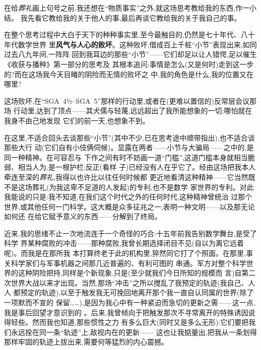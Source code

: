 在给\emph{葬礼}画上句号之前,我还想在“物质事实”之外,就这场思考教给我的东西,作一小结。
我先看它教给我的关于他人的事,最后再谈它教给我的关于我自己的事。

在整个思考过程中大白于天下的种种事实里,至今最触目的,仍然是七十年代、八十年代数学世界
里\textbf{风气与人心的败坏}。这种败坏,借成百上千桩“小节”表现出来,如同过去八九年间,一阵阵
回到我耳边的那些“小节”——它们却足以让人错愕,足以催生《收获与播种》第一部分的思考及
其根本追问:事情是怎么(又是何时)走到这一步的?而在这场我今天目睹的阴险而无情的败坏之
中,我的角色是什么,我的位置又在哪里?

\pmark{}这场败坏,在“SGA~4½--SGA~5”那样的行动里,或者在(更难以置信的)反常层会议那场
行动里,达到了顶点——其犬儒与轻蔑,远远超出了我所能想象的一切;哪怕就在我身不由己地发现
它们的前一天,也想象不到。

在这里,不适合回头去谈那些“小节”(其中不少,已在思考途中顺带指出),也不适合谈那些大行
动(它们自有小伎俩伺候)。显露在两者——小节与大骗局——之中的,是同一种精神。在可容忍与
下作之间有时不妨画一道“门槛”,这道门槛本身就相当脆弱、相当人为,是一根护栏;反正(看样
子)已经没有人在乎它了。经由这场把我本人牵连至深的\emph{葬礼},我得以也许比以往任何时候都
更近地看清这种精神——它当然既不是这场葬礼(为我这卑不足道的人发起)的专利,也不是数学
家世界的专利。对此我能说的只是:我不知道,在我们这个时代之外的任何时代,这种精神曾统治
过那个世界,或其他任何一门科学。这大概是众多征兆之一,表明一种文明——以及那无论如何还
在给它赋予意义的东西——分解到了终局。

\pmark 近来,我的思绪不止一次地流连于一个奇怪的巧合:十五年前我告别数学舞台,是受了科学
界某种腐败的冲击——那种腐败,我曾长期选择闭目不见(自以为离它远着呢)。而我是在那所我
本打算终老于此的机构里,猝然同它打了个照面。在那里,事关科学家们与军事机器之间那几近普遍的、有利可图的
串通。军方对整个科学世界的这种阴险把持,同样是个新现象,只是(至少就我们今日所知的规模而
言)自第二次世界大战以来才出现。当然,那场“冲击”之所以搅乱了我预定的轨迹(我自己、人人
都预定的轨迹),以至于触发我无可挽回地离开那个我一直自认同属的世界(除了一项默而不宣的
保留……),是因为我心中有一种紧迫而急切的更新之需——这一点,我是事后回望才意识到的
。后来,我曾倾向于把触发那次不寻常离开的特殊诱因说得轻些。然而我也知道,那些惯性之力
有多么巨大(同时又是多么无形):它们要把我们永远拴在同一条“轨迹”上,敌视内在的更新——
这也让我掂量出,把我从一条划得那样牢固的轨迹上拔出来,需要何等猛烈的内心震撼。

